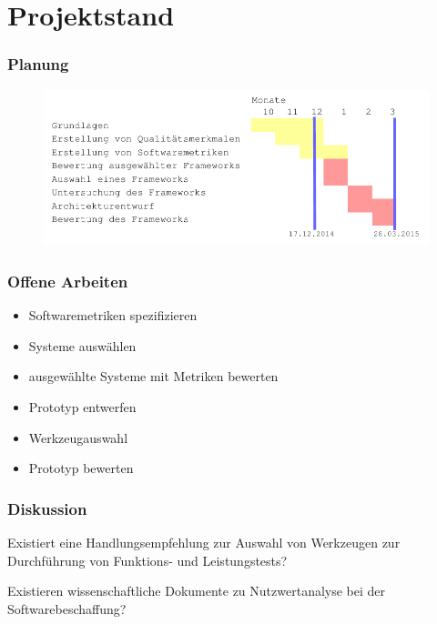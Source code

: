 \documentclass{beamer}
\begin{document}
\section{Projektstand}
\begin{frame}\frametitle{Planung}
\begin{figure}[htb]
  \begin{center}
    \includegraphics[width=1\hsize]{Plan_cropped.pdf}
  \end{center}
\end{figure}
\end{frame}


\begin{frame}\frametitle{Offene Arbeiten}
\begin{itemize}
\item Softwaremetriken spezifizieren
\item Systeme auswählen
\item ausgewählte Systeme mit Metriken bewerten
\item Prototyp entwerfen
\item Werkzeugauswahl
\item Prototyp bewerten
\end{itemize}
\end{frame}

\begin{frame}\frametitle{Diskussion}
\begin{block}{}
Existiert eine Handlungsempfehlung zur Auswahl von Werkzeugen zur Durchführung von Funktions- und Leistungstests?
\end{block}
\vspace{\baselineskip}
\begin{block}{}
Existieren wissenschaftliche Dokumente zu Nutzwertanalyse bei der Softwarebeschaffung?
\end{block}


\end{frame}
\end{document}
